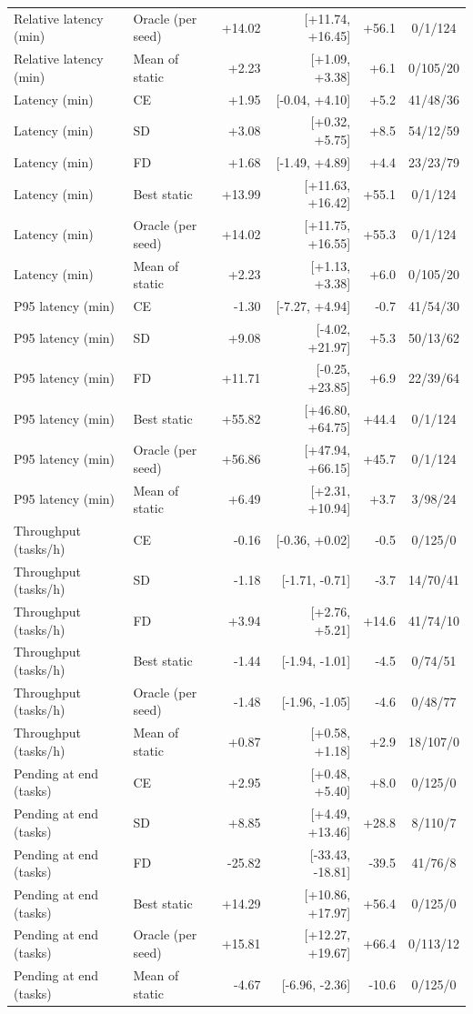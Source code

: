 \begin{table}[t]
\begin{tabular}{llrrrc}
Relative latency (min) & Oracle (per seed) & +14.02 & [+11.74, +16.45] & +56.1 & 0/1/124 \\
Relative latency (min) & Mean of static & +2.23 & [+1.09, +3.38] & +6.1 & 0/105/20 \\
\midrule
Latency (min) & CE & +1.95 & [-0.04, +4.10] & +5.2 & 41/48/36 \\
Latency (min) & SD & +3.08 & [+0.32, +5.75] & +8.5 & 54/12/59 \\
Latency (min) & FD & +1.68 & [-1.49, +4.89] & +4.4 & 23/23/79 \\
Latency (min) & Best static & +13.99 & [+11.63, +16.42] & +55.1 & 0/1/124 \\
Latency (min) & Oracle (per seed) & +14.02 & [+11.75, +16.55] & +55.3 & 0/1/124 \\
Latency (min) & Mean of static & +2.23 & [+1.13, +3.38] & +6.0 & 0/105/20 \\
\midrule
P95 latency (min) & CE & -1.30 & [-7.27, +4.94] & -0.7 & 41/54/30 \\
P95 latency (min) & SD & +9.08 & [-4.02, +21.97] & +5.3 & 50/13/62 \\
P95 latency (min) & FD & +11.71 & [-0.25, +23.85] & +6.9 & 22/39/64 \\
P95 latency (min) & Best static & +55.82 & [+46.80, +64.75] & +44.4 & 0/1/124 \\
P95 latency (min) & Oracle (per seed) & +56.86 & [+47.94, +66.15] & +45.7 & 0/1/124 \\
P95 latency (min) & Mean of static & +6.49 & [+2.31, +10.94] & +3.7 & 3/98/24 \\
\midrule
Throughput (tasks/h) & CE & -0.16 & [-0.36, +0.02] & -0.5 & 0/125/0 \\
Throughput (tasks/h) & SD & -1.18 & [-1.71, -0.71] & -3.7 & 14/70/41 \\
Throughput (tasks/h) & FD & +3.94 & [+2.76, +5.21] & +14.6 & 41/74/10 \\
Throughput (tasks/h) & Best static & -1.44 & [-1.94, -1.01] & -4.5 & 0/74/51 \\
Throughput (tasks/h) & Oracle (per seed) & -1.48 & [-1.96, -1.05] & -4.6 & 0/48/77 \\
Throughput (tasks/h) & Mean of static & +0.87 & [+0.58, +1.18] & +2.9 & 18/107/0 \\
\midrule
Pending at end (tasks) & CE & +2.95 & [+0.48, +5.40] & +8.0 & 0/125/0 \\
Pending at end (tasks) & SD & +8.85 & [+4.49, +13.46] & +28.8 & 8/110/7 \\
Pending at end (tasks) & FD & -25.82 & [-33.43, -18.81] & -39.5 & 41/76/8 \\
Pending at end (tasks) & Best static & +14.29 & [+10.86, +17.97] & +56.4 & 0/125/0 \\
Pending at end (tasks) & Oracle (per seed) & +15.81 & [+12.27, +19.67] & +66.4 & 0/113/12 \\
Pending at end (tasks) & Mean of static & -4.67 & [-6.96, -2.36] & -10.6 & 0/125/0 \\
\bottomrule
\end{tabular}
\end{table}
